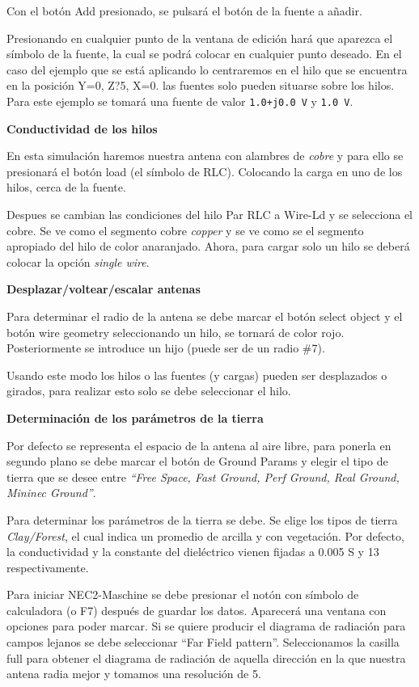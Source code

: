 \documentclass[12pt]{article}
\begin{document}
Con el bot\'on Add presionado, se pulsar\'a el bot\'on de la fuente a añadir.

Presionando en cualquier punto de la ventana de edici\'on har\'a que aparezca el
s\'imbolo de la fuente, la cual se podr\'a colocar en cualquier punto deseado.
En el caso del ejemplo que se est\'a aplicando lo centraremos en el hilo que se
encuentra en la posici\'on Y=0, Z?5, X=0. las fuentes solo pueden situarse
sobre los hilos. Para este ejemplo se tomar\'a una fuente de valor
\texttt{1.0+j0.0 V} y \texttt{1.0 V}.

\textbf{Conductividad de los hilos}

En esta simulaci\'on haremos nuestra antena con alambres de \textit{cobre} y
para ello se presionar\'a el bot\'on load (el s\'imbolo de RLC). Colocando la
carga en uno de los hilos, cerca de la fuente.

Despues se cambian las condiciones del hilo Par RLC a Wire-Ld y se selecciona
el cobre. Se ve como el segmento cobre \textit{copper} y se ve como se el
segmento apropiado del hilo de color anaranjado. Ahora, para cargar solo un
hilo se deber\'a colocar la opci\'on \textit{single wire}. 

\textbf{Desplazar/voltear/escalar antenas}

Para determinar el radio de la antena se debe marcar el bot\'on  select object
y el bot\'on wire geometry seleccionando un hilo, se tornar\'a de color rojo.
Posteriormente se introduce un hijo (puede ser de un radio \#7).

Usando este modo los hilos o las fuentes (y cargas) pueden ser desplazados o
girados, para realizar esto solo se debe seleccionar el hilo.

\textbf{Determinaci\'on de los par\'ametros de la tierra}

Por defecto se representa el espacio de la antena al aire libre, para ponerla
en segundo plano se debe marcar el bot\'on de Ground Params y elegir el tipo de
tierra que se desee entre  \textit{``Free Space, Fast Ground, Perf Ground, Real
Ground, Mininec Ground''}.

Para determinar los par\'ametros de la tierra se debe. Se elige los tipos de
tierra \textit{Clay/Forest}, el cual indica un promedio de arcilla y con
vegetaci\'on. Por defecto, la conductividad y la constante del diel\'ectrico
vienen fijadas a 0.005 S y 13 respectivamente.

  

Para iniciar NEC2-Maschine se debe presionar el not\'on con s\'imbolo de
calculadora (o F7) despu\'es de guardar los datos. Aparecer\'a una ventana con
opciones para poder marcar. Si se quiere producir el diagrama de radiación para
campos lejanos se debe seleccionar ``Far Field pattern''. Seleccionamos la
casilla full para obtener el diagrama de radiación de aquella dirección en la
que nuestra antena radia mejor y tomamos una resolución de 5.
\end{document}
